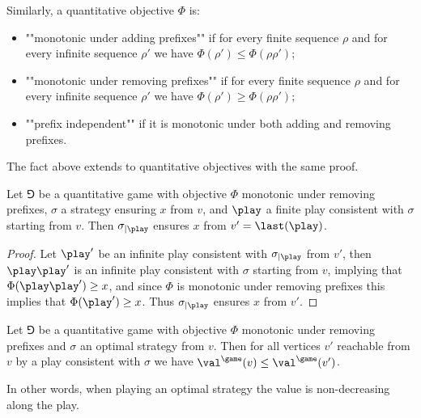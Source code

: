Similarly, a quantitative objective $\Phi$ is:
\begin{itemize}
	\item ""monotonic under adding prefixes"" if for every finite sequence $\rho$ and for every infinite sequence $\rho'$
	we have $\Phi(\rho') \le \Phi(\rho \rho')$;
	\item ""monotonic under removing prefixes"" if for every finite sequence $\rho$ and for every infinite sequence $\rho'$
	we have $\Phi(\rho') \ge \Phi(\rho \rho')$;
	\item ""prefix independent"" if it is monotonic under both adding and removing prefixes.
\end{itemize}
The fact above extends to quantitative objectives with the same proof.
\begin{fact}
\label{1-fact:winning_prefix_independent_quantitative}
Let $\Game$ be a quantitative game with objective $\Phi$ monotonic under removing prefixes,
$\sigma$ a strategy ensuring $x$ from $v$, and $\play$ a finite play consistent with $\sigma$ starting from $v$.
Then $\sigma_{\mid \play}$ ensures $x$ from $v' = \last(\play)$.
\end{fact}
\begin{proof}
Let $\play'$ be an infinite play consistent with $\sigma_{\mid \play}$ from $v'$,
then $\play \play'$ is an infinite play consistent with $\sigma$ starting from $v$, 
implying that $\Phi(\play \play') \ge x$, and since $\Phi$ is monotonic under removing prefixes
this implies that $\Phi(\play') \ge x$. Thus $\sigma_{\mid \play}$ ensures $x$ from $v'$.
\end{proof}

\begin{corollary}
Let $\Game$ be a quantitative game with objective $\Phi$ monotonic under removing prefixes and $\sigma$ an optimal strategy from $v$.
Then for all vertices $v'$ reachable from $v$ by a play consistent with $\sigma$ we have $\val^{\game}(v) \le \val^{\game}(v')$.
\end{corollary}
In other words, when playing an optimal strategy the value is non-decreasing along the play.
